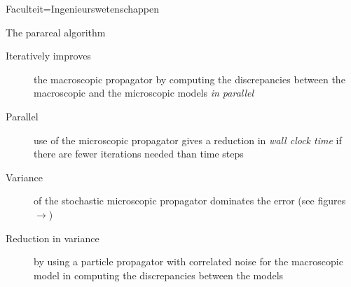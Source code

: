 \documentclass[landscape,a1paper,fontscale=0.45]{kuleuvenposter}
\begin{document}
\begin{poster}{Faculteit=Ingenieurswetenschappen}
\begin{posterbox}%
[name=parareal micro-macro, column=1, above=bottom, boxColorOne=KULeuvenFaculteit!15!white, borderColor=KULeuvenFaculteit]%
{The parareal algorithm}
\begin{description}
\item[Iteratively improves] the macroscopic propagator by computing the discrepancies between the {\color{KULeuvenBlauw}macroscopic} and the {\color{KULeuvenFaculteit}microscopic} models \emph{in parallel}
\item[Parallel] use of the microscopic propagator gives a reduction in \emph{wall clock time} if there are fewer iterations needed than time steps
\item[Variance] of the stochastic microscopic propagator dominates the error (see figures $\rightarrow$)%
\item[Reduction in variance] by using a particle propagator with {\color{KULeuvenSecundair}correlated noise} for the macroscopic model in computing the discrepancies between the models
\end{description}

\end{posterbox}


\end{poster}
\end{document}
